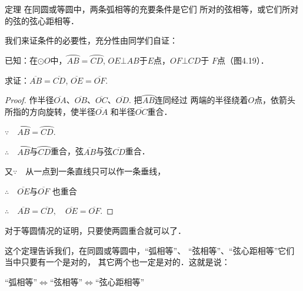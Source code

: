 \begin{blk}
    {定理} 在同圆或等圆中，两条弧相等的充要条件是它们
所对的弦相等，或它们所对的弦的弦心距相等．
\end{blk}

\begin{figure}[htp]
    \centering
    \caption{}
\end{figure}

我们来证条件的必要性，充分性由同学们自证：

已知：在$\odot O$中，$\wideparen{AB}=\wideparen{CD}$, 
$OE\bot  AB$于$E$点，$OF\bot CD$于
$F$点（图4.19）．

求证：$\overline{AB}=\overline{CD}$, $\overline{OE}=\overline{OF}$.

\begin{proof}
    作半径$\overline{OA}$、$\overline{OB}$、$\overline{OC}$、$\overline{OD}$. 把$\wideparen{AB}$连同经过
两端的半径绕着$O$点，依箭头所指的方向旋转，使半径$\overline{OA}$
和半径$\overline{OC}$重合．

$\because\quad \wideparen{AB}=\wideparen{CD}$.

$\therefore\quad \wideparen{AB}$与$\wideparen{CD}$重合，弦$\overline{AB}$与弦$\overline{CD}$重合．

又$\because\quad $从一点到一条直线只可以作一条垂线，

$\therefore\quad \overline{OE}$与$\overline{OF}$
也重合

$\therefore\quad \overline{AB}=\overline{CD},\quad \overline{OE}=\overline{OF}$.
\end{proof}

对于等圆情况的证明，只要使两圆重合就可以了．

这个定理告诉我们，在同圆或等圆中，“弧相等”、
“弦相等”、“弦心距相等”它们当中只要有一个是对的，
其它两个也一定是对的．这就是说：

\begin{blk}{}
   “弧相等”$\Longleftrightarrow$“弦相等”$\Longleftrightarrow$“弦心距相等” 
\end{blk}


